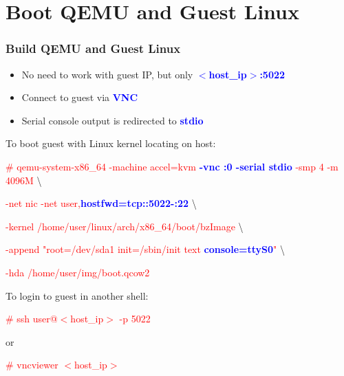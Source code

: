 \documentclass[aspectratio=169]{beamer}
\begin{document}
\section{Boot QEMU and Guest Linux}
\begin{frame}
\frametitle{Build QEMU and Guest Linux}
\begin{itemize}
\item No need to work with guest IP, but only \textbf{\textcolor{blue}{$<$host\_ip$>$:5022}}
\item Connect to guest via \textbf{\textcolor{blue}{VNC}}
\item Serial console output is redirected to \textbf{\textcolor{blue}{stdio}}
\end{itemize}
\begin{block}{}

To boot guest with Linux kernel locating on host:

\textcolor{red}{\# qemu-system-x86\_64 -machine accel=kvm \textbf{\textcolor{blue}{-vnc :0 -serial stdio}} -smp 4 -m 4096M} \textbackslash

\textcolor{red}{-net nic -net user,\textbf{\textcolor{blue}{hostfwd=tcp::5022-:22}}} \textbackslash

\textcolor{red}{-kernel /home/user/linux/arch/x86\_64/boot/bzImage} \textbackslash
	
\textcolor{red}{-append "root=/dev/sda1 init=/sbin/init text \textbf{\textcolor{blue}{console=ttyS0}}"} \textbackslash

\textcolor{red}{-hda /home/user/img/boot.qcow2} \newline

To login to guest in another shell:

\textcolor{red}{\# ssh user@$<$host\_ip$>$ -p 5022}

or

\textcolor{red}{\# vncviewer $<$host\_ip$>$}

\end{block}
\end{frame}

\end{document}
